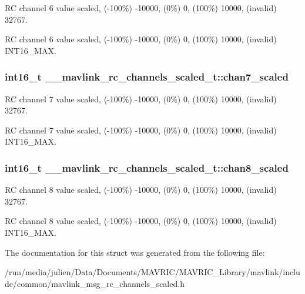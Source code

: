 R\+C channel 6 value scaled, (-\/100\%) -\/10000, (0\%) 0, (100\%) 10000, (invalid) 32767. 

R\+C channel 6 value scaled, (-\/100\%) -\/10000, (0\%) 0, (100\%) 10000, (invalid) I\+N\+T16\+\_\+\+M\+A\+X. \hypertarget{struct____mavlink__rc__channels__scaled__t_a1e3c67b2bff9476d2c2da3e757993a1b}{
\subsubsection[{chan7\+\_\+scaled}]{\setlength{\rightskip}{0pt plus 5cm}int16\+\_\+t \+\_\+\+\_\+mavlink\+\_\+rc\+\_\+channels\+\_\+scaled\+\_\+t\+::chan7\+\_\+scaled}}\label{struct____mavlink__rc__channels__scaled__t_a1e3c67b2bff9476d2c2da3e757993a1b}


R\+C channel 7 value scaled, (-\/100\%) -\/10000, (0\%) 0, (100\%) 10000, (invalid) 32767. 

R\+C channel 7 value scaled, (-\/100\%) -\/10000, (0\%) 0, (100\%) 10000, (invalid) I\+N\+T16\+\_\+\+M\+A\+X. \hypertarget{struct____mavlink__rc__channels__scaled__t_a53c6f6016f7f9e8a93ed1b1b959e1de7}{
\subsubsection[{chan8\+\_\+scaled}]{\setlength{\rightskip}{0pt plus 5cm}int16\+\_\+t \+\_\+\+\_\+mavlink\+\_\+rc\+\_\+channels\+\_\+scaled\+\_\+t\+::chan8\+\_\+scaled}}\label{struct____mavlink__rc__channels__scaled__t_a53c6f6016f7f9e8a93ed1b1b959e1de7}


R\+C channel 8 value scaled, (-\/100\%) -\/10000, (0\%) 0, (100\%) 10000, (invalid) 32767. 

R\+C channel 8 value scaled, (-\/100\%) -\/10000, (0\%) 0, (100\%) 10000, (invalid) I\+N\+T16\+\_\+\+M\+A\+X. 

The documentation for this struct was generated from the following file\+:\begin{DoxyCompactItemize}
\item 
/run/media/julien/\+Data/\+Documents/\+M\+A\+V\+R\+I\+C/\+M\+A\+V\+R\+I\+C\+\_\+\+Library/mavlink/include/common/mavlink\+\_\+msg\+\_\+rc\+\_\+channels\+\_\+scaled.\+h\end{DoxyCompactItemize}
